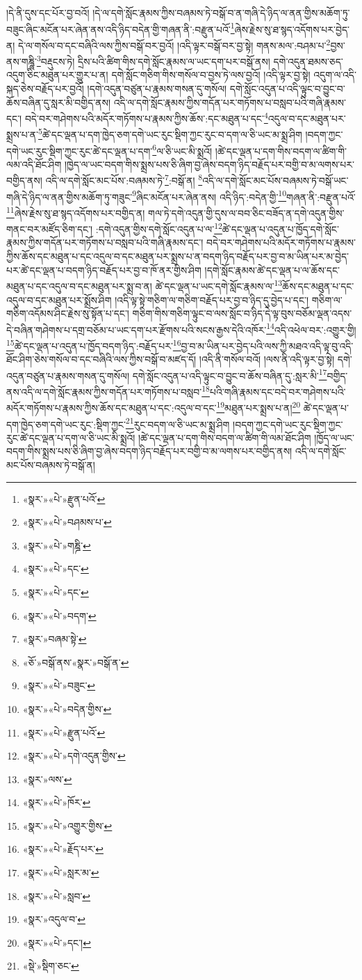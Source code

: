 །དེ་ནི་དུས་དང་པོར་བྱ་བའོ། །དེ་ལ་དགེ་སློང་རྣམས་ཀྱིས་བཞམས་ཏེ་བསྒོ་བ་ན་གཞི་དེ་ཉིད་ལ་ནན་གྱིས་མཆོག་ཏུ་བཟུང་ཞིང་མངོན་པར་ཞེན་ནས་འདི་ཉིད་བདེན་གྱི་གཞན་ནི་:བརྫུན་པའོ་\footnote{«སྣར་»«པེ་»རྫུན་པའོ་}ཞེས་རྗེས་སུ་ཐ་སྙད་འདོགས་པར་བྱེད་ན། དེ་ལ་གསོལ་བ་དང་བཞིའི་ལས་ཀྱིས་བསྒོ་བར་བྱའོ། །འདི་ལྟར་བསྒོ་བར་བྱ་སྟེ། གནས་མལ་:བཤམ་པ་\footnote{«སྣར་»«པེ་»བཤམས་པ་}བྱས་ནས་གཎྜཱི་\footnote{«སྣར་»«པེ་»གཎྜི་}བརྡུངས་ཏེ། དྲིས་པའི་ཚིག་གིས་དགེ་སློང་རྣམས་ལ་ཡང་དག་པར་བསྒོ་ནས། དགེ་འདུན་ཐམས་ཅད་འདུག་ཅིང་མཐུན་པར་གྱུར་པ་ན། དགེ་སློང་གཅིག་གིས་གསོལ་བ་བྱས་ཏེ་ལས་བྱའོ། །འདི་ལྟར་བྱ་སྟེ། འདུག་ལ་འདི་སྐད་ཅེས་བརྗོད་པར་བྱའོ། །དགེ་འདུན་བཙུན་པ་རྣམས་གསན་དུ་གསོལ། དགེ་སློང་འདུན་པ་འདི་ལྟུང་བ་བྱུང་བ་ཆོས་བཞིན་དུ་སླར་མི་བགྱིད་ནས། འདི་ལ་དགེ་སློང་རྣམས་ཀྱིས་གདོན་པར་གཏོགས་པ་བསླབ་པའི་གཞི་རྣམས་དང་། བདེ་བར་གཤེགས་པའི་མདོར་གཏོགས་པ་རྣམས་ཀྱིས་ཆོས་:དང་མཐུན་པ་དང་\footnote{«སྣར་»«པེ་»དང་}འདུལ་བ་དང་མཐུན་པར་སྨྲས་པ་ན་\footnote{«སྣར་»«པེ་»དང་}ཚེ་དང་ལྡན་པ་དག་ཁྱེད་ཅག་དགེ་ཡང་རུང་སྡིག་ཀྱང་རུང་བ་དག་ལ་ཅི་ཡང་མ་སྨྲ་ཤིག །བདག་ཀྱང་དགེ་ཡང་རུང་སྡིག་ཀྱང་རུང་ཚེ་དང་ལྡན་པ་དག་\footnote{«སྣར་»«པེ་»བདག་}ལ་ཅི་ཡང་མི་སྨྲའོ། །ཚེ་དང་ལྡན་པ་དག་གིས་བདག་ལ་ཚིག་གི་ལམ་འདི་ཐོང་ཤིག །ཁྱེད་ལ་ཡང་བདག་གིས་སྨྲས་པས་ཅི་ཞིག་བྱ་ཞེས་བདག་ཉིད་བརྗོད་པར་བགྱི་བ་མ་ལགས་པར་བགྱིད་ནས། འདི་ལ་དགེ་སློང་མང་པོས་:བཞམས་ཏེ་\footnote{«སྣར་»བཞམ་སྟེ་}:བསྒོ་ན། \footnote{«ཅོ་»བསྒོ་ནས་«སྣར་»བསྒོ་ན་}འདི་ལ་དགེ་སློང་མང་པོས་བཞམས་ཏེ་བསྒོ་ཡང་གཞི་དེ་ཉིད་ལ་ནན་གྱིས་མཆོག་ཏུ་གཟུང་\footnote{«སྣར་»«པེ་»བཟུང་}ཞིང་མངོན་པར་ཞེན་ནས། འདི་ཉིད་:བདེན་གྱི་\footnote{«སྣར་»«པེ་»བདེན་གྱིས་}གཞན་ནི་:བརྫུན་པའོ་\footnote{«སྣར་»«པེ་»རྫུན་པའོ་}ཞེས་རྗེས་སུ་ཐ་སྙད་འདོགས་པར་བགྱིད་ན། གལ་ཏེ་དགེ་འདུན་གྱི་དུས་ལ་བབ་ཅིང་བཟོད་ན་དགེ་འདུན་གྱིས་གནང་བར་མཛོད་ཅིག་དང་། :དགེ་འདུན་གྱིས་དགེ་སློང་འདུན་པ་ལ་\footnote{«སྣར་»«པེ་»དགེ་འདུན་གྱིས་}ཚེ་དང་ལྡན་པ་འདུན་པ་ཁྱོད་དགེ་སློང་རྣམས་ཀྱིས་གདོན་པར་གཏོགས་པ་བསླབ་པའི་གཞི་རྣམས་དང་། བདེ་བར་གཤེགས་པའི་མདོར་གཏོགས་པ་རྣམས་ཀྱིས་ཆོས་དང་མཐུན་པ་དང་འདུལ་བ་དང་མཐུན་པར་སྨྲས་པ་ན་བདག་ཉིད་བརྗོད་པར་བྱ་བ་མ་ཡིན་པར་མ་བྱེད་པར་ཚེ་དང་ལྡན་པ་བདག་ཉིད་བརྗོད་པར་བྱ་བ་ཁོ་ནར་གྱིས་ཤིག །དགེ་སློང་རྣམས་ཚེ་དང་ལྡན་པ་ལ་ཆོས་དང་མཐུན་པ་དང་འདུལ་བ་དང་མཐུན་པར་སྨྲ་བ་ན། ཚེ་དང་ལྡན་པ་ཡང་དགེ་སློང་རྣམས་ལ་\footnote{«སྣར་»ལས་}ཆོས་དང་མཐུན་པ་དང་འདུལ་བ་དང་མཐུན་པར་སྨྲོས་ཤིག །འདི་ལྟ་སྟེ་གཅིག་ལ་གཅིག་བརྗོད་པར་བྱ་བ་ཉིད་དུ་བྱེད་པ་དང་། གཅིག་ལ་གཅིག་འདོམས་ཤིང་རྗེས་སུ་སྟོན་པ་དང་། གཅིག་གིས་གཅིག་ལྟུང་བ་ལས་སློང་བ་ཉིད་དེ་ལྟ་བུས་བཅོམ་ལྡན་འདས་དེ་བཞིན་གཤེགས་པ་དགྲ་བཅོམ་པ་ཡང་དག་པར་རྫོགས་པའི་སངས་རྒྱས་དེའི་འཁོར་\footnote{«སྣར་»«པེ་»ཁོར་}འདི་འཕེལ་བར་:འགྱུར་གྱི། \footnote{«སྣར་»«པེ་»འགྱུར་གྱིས་}ཚེ་དང་ལྡན་པ་འདུན་པ་ཁྱོད་བདག་ཉིད་:བརྗོད་པར་\footnote{«སྣར་»«པེ་»རྗོད་པར་}བྱ་བ་མ་ཡིན་པར་བྱེད་པའི་ལས་ཀྱི་མཐའ་འདི་ལྟ་བུ་འདི་ཐོང་ཤིག་ཅེས་གསོལ་བ་དང་བཞིའི་ལས་ཀྱིས་བསྒོ་བ་མཛད་དོ། །འདི་ནི་གསོལ་བའོ། །ལས་ནི་འདི་ལྟར་བྱ་སྟེ། དགེ་འདུན་བཙུན་པ་རྣམས་གསན་དུ་གསོལ། དགེ་སློང་འདུན་པ་འདི་ལྟུང་བ་བྱུང་བ་ཆོས་བཞིན་དུ་:སླར་མི་\footnote{«སྣར་»«པེ་»སླར་མ་}བགྱིད་ནས་འདི་ལ་དགེ་སློང་རྣམས་ཀྱིས་གདོན་པར་གཏོགས་པ་བསླབ་\footnote{«སྣར་»«པེ་»སླབ་}པའི་གཞི་རྣམས་དང་བདེ་བར་གཤེགས་པའི་མདོར་གཏོགས་པ་རྣམས་ཀྱིས་ཆོས་དང་མཐུན་པ་དང་:འདུལ་བ་དང་\footnote{«སྣར་»འདུལ་བ་}མཐུན་པར་སྨྲས་པ་ན།\footnote{«སྣར་»«པེ་»དང་།} ཚེ་དང་ལྡན་པ་དག་ཁྱེད་ཅག་དགེ་ཡང་རུང་:སྡིག་ཀྱང་\footnote{«སྡེ་»སྡིག་ཅང་}རུང་བདག་ལ་ཅི་ཡང་མ་སྨྲ་ཤིག །བདག་ཀྱང་དགེ་ཡང་རུང་སྡིག་ཀྱང་རུང་ཚེ་དང་ལྡན་པ་དག་ལ་ཅི་ཡང་མི་སྨྲའོ། །ཚེ་དང་ལྡན་པ་དག་གིས་བདག་ལ་ཚིག་གི་ལམ་ཐོང་ཤིག །ཁྱོད་ལ་ཡང་བདག་གིས་སྨྲས་པས་ཅི་ཞིག་བྱ་ཞེས་བདག་ཉིད་བརྗོད་པར་བགྱི་བ་མ་ལགས་པར་བགྱིད་ནས། འདི་ལ་དགེ་སློང་མང་པོས་བཞམས་ཏེ་བསྒོ་ན། 
